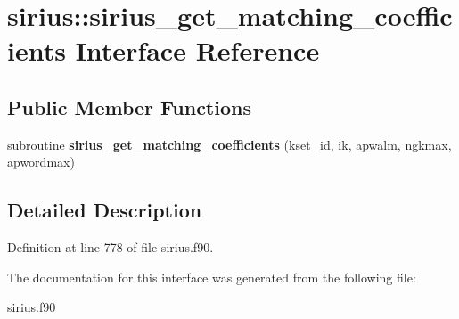 \hypertarget{interfacesirius_1_1sirius__get__matching__coefficients}{}\section{sirius\+:\+:sirius\+\_\+get\+\_\+matching\+\_\+coefficients Interface Reference}
\label{interfacesirius_1_1sirius__get__matching__coefficients}
\subsection*{Public Member Functions}
\begin{DoxyCompactItemize}
\item 
\hypertarget{interfacesirius_1_1sirius__get__matching__coefficients_a56ce398a6cd801f9b880de9a22ea61e1}{}subroutine {\bfseries sirius\+\_\+get\+\_\+matching\+\_\+coefficients} (kset\+\_\+id, ik, apwalm, ngkmax, apwordmax)\label{interfacesirius_1_1sirius__get__matching__coefficients_a56ce398a6cd801f9b880de9a22ea61e1}

\end{DoxyCompactItemize}


\subsection{Detailed Description}


Definition at line 778 of file sirius.\+f90.



The documentation for this interface was generated from the following file\+:\begin{DoxyCompactItemize}
\item 
sirius.\+f90\end{DoxyCompactItemize}
